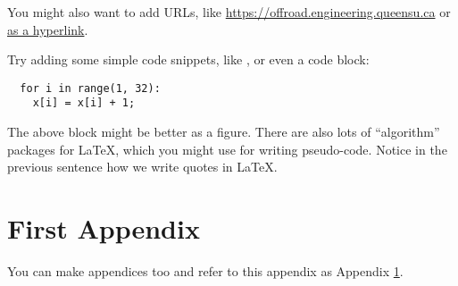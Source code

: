 \documentclass[letterpaper,fleqn,oneside]{qu-handout}
\begin{document}
You might also want to add URLs, like \url{https://offroad.engineering.queensu.ca} or \href{https://offroad.engineering.queensu.ca}{as a hyperlink}.  

Try adding some simple code snippets, like  , or even a code block:
\begin{verbatim}
  for i in range(1, 32):
    x[i] = x[i] + 1;
\end{verbatim}
The above block might be better as a figure.  There are also lots of ``algorithm'' packages for LaTeX, which you might use for writing pseudo-code.  Notice in the previous sentence how we write quotes in \LaTeX.






\appendix

\section{First Appendix}
\label{sec:appendix}

You can make appendices too and refer to this appendix as Appendix \ref{sec:appendix}.

\end{document}
